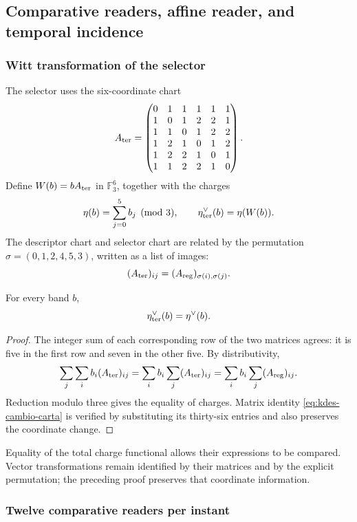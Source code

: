 \subsection{Comparative readers, affine reader, and temporal incidence}

\subsubsection{Witt transformation of the selector}

The selector uses the six-coordinate chart
\[
 A_{\rm ter}=
 \begin{pmatrix}
 0&1&1&1&1&1\\
 1&0&1&2&2&1\\
 1&1&0&1&2&2\\
 1&2&1&0&1&2\\
 1&2&2&1&0&1\\
 1&1&2&2&1&0
 \end{pmatrix}.
\]
Define $W(b)=bA_{\rm ter}$ in $\mathbb F_3^6$, together with the charges
\[
 \eta(b)=\sum_{j=0}^5 b_j\pmod3,
 \qquad\eta_{\rm ter}^\vee(b)=\eta(W(b)).
\]
The descriptor chart and selector chart are related by the permutation $\sigma=(0,1,2,4,5,3)$, written as a list of images:
\begin{equation}
 (A_{\rm ter})_{ij}=(A_{\rm reg})_{\sigma(i),\sigma(j)}.
 \label{eq:kdes-cambio-carta}
\end{equation}

\begin{lemma}
For every band $b$,
\[
 \eta_{\rm ter}^\vee(b)=\eta^\vee(b).
\]
\end{lemma}
\begin{proof}
The integer sum of each corresponding row of the two matrices agrees:
it is five in the first row and seven in the other five. By
distributivity,
\[
 \sum_j\sum_i b_i(A_{\rm ter})_{ij}
 =\sum_i b_i\sum_j(A_{\rm ter})_{ij}
 =\sum_i b_i\sum_j(A_{\rm reg})_{ij}.
\]
Reduction modulo three gives the equality of charges. Matrix identity
\eqref{eq:kdes-cambio-carta} is verified by substituting its
thirty-six entries and also preserves the coordinate change.
\end{proof}

Equality of the total charge functional allows their expressions to be compared. Vector transformations remain identified by their matrices and by the explicit permutation; the preceding proof preserves that coordinate information.

\subsubsection{Twelve comparative readers per instant}

